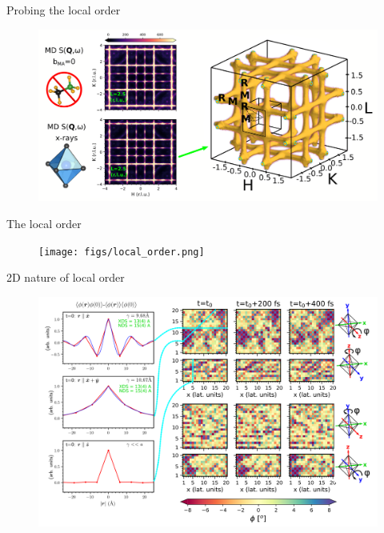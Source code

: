 \documentclass[12pt]{beamer}
\begin{document}

\begin{frame}{Probing the local order}

\begin{figure}
    \includegraphics[scale=0.275]{figs/xds.png}
\end{figure}

\end{frame}


\begin{frame}{The local order}

\begin{figure}
    \texttt{[image: figs/local\_order.png]}
\end{figure}

\end{frame}


\begin{frame}{2D nature of local order}

\begin{figure}
    \includegraphics[width=1.0\linewidth]{figs/local_order_2.png}
\end{figure}

\end{frame}
\end{document}
